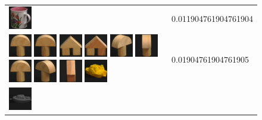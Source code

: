 \begin{figure}[tbp]
\begin{center}
\begin{tabular}{m{11cm} | m{3cm} |}
\includegraphics[width=1cm]{coil/beeld-10.eps}
& {\scriptsize 0.011904761904761904}
\\
\includegraphics[width=1cm]{coil/beeld-0.eps}
\includegraphics[width=1cm]{coil/beeld-1.eps}
\includegraphics[width=1cm]{coil/beeld-42.eps}
\includegraphics[width=1cm]{coil/beeld-43.eps}
\includegraphics[width=1cm]{coil/beeld-3.eps}
\includegraphics[width=1cm]{coil/beeld-2.eps}
\includegraphics[width=1cm]{coil/beeld-0.eps}
\includegraphics[width=1cm]{coil/beeld-4.eps}
\includegraphics[width=1cm]{coil/beeld-44.eps}
\includegraphics[width=1cm]{coil/beeld-16.eps}
& {\scriptsize 0.01904761904761905}
\\
\includegraphics[width=1cm]{coil/beeld-24.eps}

\end{tabular}
\end{center}
\end{figure}
